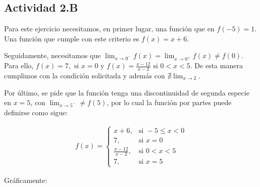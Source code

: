 \subsection*{Actividad 2.B}

Para este ejercicio necesitamos, en primer lugar, una función que en $f(-5) = 1$.
Una función que cumple con este criterio es $f(x) = x + 6$.

Seguidamente, necesitamos que $\lim_{x \to 0^-}f(x) = \lim_{x \to 0^+}f(x) \neq f(0)$.
Para ello, $f(x) = 7, \text{ si } x = 0$
y $f(x) = \frac{x - 12}{x - 2} \text{ si } 0 < x < 5$. 
De esta manera cumplimos con la condición solicitada y además con $\nexists \lim_{x \to 2}$.

Por último, se pide que la función tenga una discontinuidad de segunda especie en $x = 5$, con $\lim_{x \to 5^-} \neq f(5)$, por lo cual la función por partes
puede definirse como sigue:

\begin{align*}
    f(x) =
    \begin{cases}
        x + 6,            & \text{si } -5 \leq x < 0 \\
        7,                & \text{si } x = 0         \\
        \frac{x-12}{x-2}, & \text{si } 0 < x < 5     \\
        7,                & \text{si } x = 5
    \end{cases}
\end{align*}

Gráficamente:

\begin{center}
\end{center}
